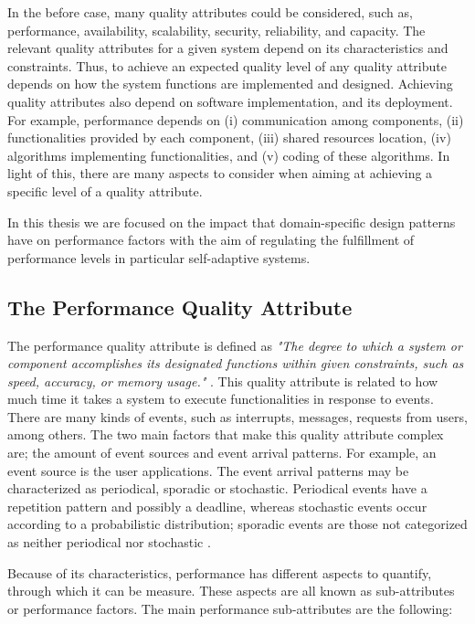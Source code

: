 In the before case, many quality attributes could be considered, such as, performance, availability, scalability, security, reliability, and capacity. The relevant quality attributes for a given system depend on its characteristics and constraints. Thus, to achieve an expected quality level of any quality attribute depends on how the system functions are implemented and designed. Achieving quality attributes also depend on software implementation, and its deployment. For example, performance depends on (i) communication among components, (ii) functionalities provided by each component, (iii) shared resources location, (iv) algorithms implementing functionalities, and (v) coding of these algorithms. In light of this, there are many aspects to consider when aiming at achieving a specific level of a quality attribute.

In this thesis we are focused on the impact that domain-specific design patterns have on performance factors with the aim of regulating the fulfillment of performance levels in particular self-adaptive systems.


\subsection{The Performance Quality Attribute}
\label{subsec:performance}
The performance quality attribute is defined as \textit{"The degree to which a system or component accomplishes its designated functions within given constraints, such as speed, accuracy, or memory usage."} \cite{barbacci1995quality}. This quality attribute is related to how much time it takes a system to execute functionalities in response to events. There are many kinds of events, such as interrupts, messages, requests from users, among others. The two main factors that make this quality attribute complex are; the amount of event sources and  event arrival patterns. For example, an event source is the user applications. The event arrival patterns may be characterized as periodical, sporadic or stochastic. Periodical events have a repetition pattern and possibly a deadline, whereas stochastic events occur according to a probabilistic distribution; sporadic events are those not categorized as neither periodical nor stochastic \cite{Bass:2003:SAP:773239}.

Because of its characteristics, performance has different aspects to quantify, through which it can be measure. These aspects are all known as sub-attributes or performance factors. The main performance sub-attributes are the following:

